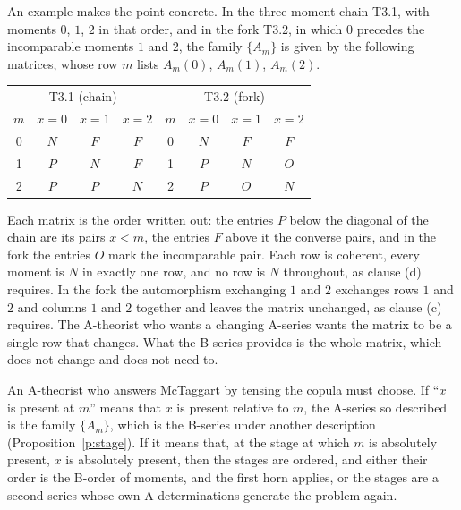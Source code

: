 \documentclass{situationist-preprint}
\begin{document}
An example makes the point concrete. In the three-moment chain T3.1, with moments $0$, $1$, $2$ in that order, and in the fork T3.2, in which $0$ precedes the incomparable moments $1$ and $2$, the family $\{A_m\}$ is given by the following matrices, whose row $m$ lists $A_m(0)$, $A_m(1)$, $A_m(2)$.
\begin{center}
\begin{tabular}{c@{\qquad}ccc@{\qquad\qquad}c@{\qquad}ccc}
\toprule
\multicolumn{4}{c}{T3.1 (chain)} & \multicolumn{4}{c}{T3.2 (fork)}\\
$m$ & $x=0$ & $x=1$ & $x=2$ & $m$ & $x=0$ & $x=1$ & $x=2$\\
\midrule
0 & $N$ & $F$ & $F$ & 0 & $N$ & $F$ & $F$\\
1 & $P$ & $N$ & $F$ & 1 & $P$ & $N$ & $O$\\
2 & $P$ & $P$ & $N$ & 2 & $P$ & $O$ & $N$\\
\bottomrule
\end{tabular}
\end{center}
Each matrix is the order written out: the entries $P$ below the diagonal of the chain are its pairs $x < m$, the entries $F$ above it the converse pairs, and in the fork the entries $O$ mark the incomparable pair. Each row is coherent, every moment is $N$ in exactly one row, and no row is $N$ throughout, as clause (d) requires. In the fork the automorphism exchanging $1$ and $2$ exchanges rows $1$ and $2$ and columns $1$ and $2$ together and leaves the matrix unchanged, as clause (c) requires. The A-theorist who wants a changing A-series wants the matrix to be a single row that changes. What the B-series provides is the whole matrix, which does not change and does not need to.


\begin{corollary}\label{c:dilemma}
An A-theorist who answers McTaggart by tensing the copula must choose. If \enquote{$x$ is present at $m$} means that $x$ is present relative to $m$, the A-series so described is the family $\{A_m\}$, which is the B-series under another description (Proposition~\ref{p:stage}). If it means that, at the stage at which $m$ is absolutely present, $x$ is absolutely present, then the stages are ordered, and either their order is the B-order of moments, and the first horn applies, or the stages are a second series whose own A-determinations generate the problem again.
\end{corollary}
\end{document}
